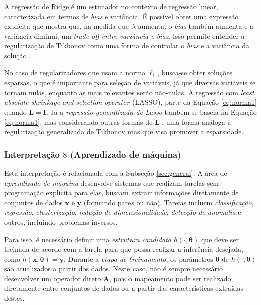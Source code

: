 A regressão de Ridge é um estimador no contexto de regressão linear, caracterizada em termos de \textit{bias} e variância. É possível obter uma expressão explícita \cite{Hoerl1970} que mostra que, na medida que $\lambda$ aumenta, o \textit{bias} também aumenta e a variância diminui, um \textit{trade-off entre variância e bias}. Isso permite entender a regularização de Tikhonov como uma forma de controlar o \textit{bias} e a variância da solução \cite[pág. 64]{hansen2010discrete}. 

No caso de regularizadores que usam a norma $\ell_1$, busca-se obter soluções esparsas, o que é importante para seleção de variáveis, já que diversas variáveis se tornam nulas, enquanto as mais relevantes serão não-nulas. A regressão com \textit{least absolute shrinkage and selection operator} (LASSO), \cite{Tibshirani1996} parte da Equação \eqref{eq:norma1} quando $\mathbf{L} = \mathbf{I}$. Já a \textit{regressão generalizada de Lasso} também se baseia na Equação \eqref{eq:norma1}, mas considerando outras formas de $\mathbf{L}$ \cite{Tibshirani2011gen}, uma forma análoga à regularização generalizada de Tikhonov mas que visa promover a esparsidade. 




\subsubsection{Interpretação $8$ (Aprendizado de máquina)}

Esta interpretação é relacionada com a Subseção \ref{sec:general}. A área de \textit{aprendizado de máquina} desenvolve sistemas que realizam tarefas sem programação explícita para elas, buscam extrair informações diretamente de conjuntos de dados $\mathbf{x}$ e $\mathbf{y}$ (formando pares ou não). Tarefas incluem \textit{classificação}, \textit{regressão}, \textit{clusterização}, \textit{redução de dimensionalidade}, \textit{detecção de anomalia} e outros, incluindo problemas inversos. 

Para isso, é necessário definir uma \textit{estrutura candidata} $h( \cdot , \bm{\theta})$ que deve ser treinada de acordo com a tarefa para que possa realizar a inferência desejada, como $h( \mathbf{x} , \bm{\theta}) = \mathbf{y}$. Durante a \textit{etapa de treinamento}, os parâmetros $\bm{\theta}$ de $h( \cdot , \bm{\theta})$ são atualizados a partir dos dados. Neste caso, não é sempre necessário desenvolver um operador direto $\mathbf{A}$, pois o mapeamento pode ser realizado diretamente entre conjuntos de dados ou a partir das características extraídas destes. 

